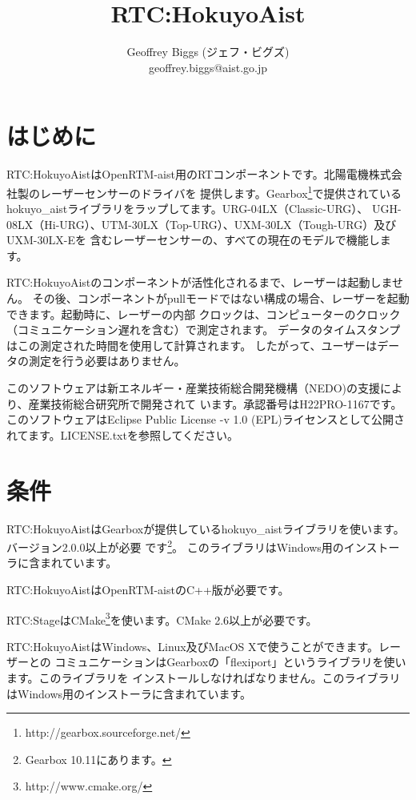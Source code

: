\documentclass[a4paper,10pt]{article}
\title{RTC:HokuyoAist}
\author{Geoffrey Biggs (ジェフ・ビグズ)\\
geoffrey.biggs@aist.go.jp}
\newenvironment{Japanese}{%
  \CJKfamily{min}%
  \CJKtilde
  \CJKnospace}{}
\begin{document}
\begin{CJK}{UTF8}{}
\begin{Japanese}

\maketitle

\section{はじめに}
\label{sec:intro}

RTC:HokuyoAistはOpenRTM-aist用のRTコンポーネントです。北陽電機株式会社製のレーザーセンサーのドライバを
提供します。Gearbox\footnote{http://gearbox.sourceforge.net/}で提供されているhokuyo\_aistライブラリをラップしてます。URG-04LX（Classic-URG）、
UGH-08LX（Hi-URG）、UTM-30LX（Top-URG）、UXM-30LX（Tough-URG）及びUXM-30LX-Eを
含むレーザーセンサーの、すべての現在のモデルで機能します。

RTC:HokuyoAistのコンポーネントが活性化されるまで、レーザーは起動しません。
その後、コンポーネントがpullモードではない構成の場合、レーザーを起動できます。起動時に、レーザーの内部
クロックは、コンピューターのクロック（コミュニケーション遅れを含む）で測定されます。
データのタイムスタンプはこの測定された時間を使用して計算されます。
したがって、ユーザーはデータの測定を行う必要はありません。

このソフトウェアは新エネルギー・産業技術総合開発機構（NEDO)の支援により、産業技術総合研究所で開発されて
います。承認番号はH22PRO-1167です。
このソフトウェアはEclipse Public License -v 1.0 (EPL)ライセンスとして公開されてます。LICENSE.txtを参照してください。

\section{条件}
\label{sec:requirements}

RTC:HokuyoAistはGearboxが提供しているhokuyo\_aistライブラリを使います。バージョン2.0.0以上が必要
です\footnote{Gearbox 10.11にあります。}。
このライブラリはWindows用のインストーラに含まれています。

RTC:HokuyoAistはOpenRTM-aistのC++版が必要です。

RTC:StageはCMake\footnote{http://www.cmake.org/}を使います。CMake
2.6以上が必要です。

RTC:HokuyoAistはWindows、Linux及びMacOS Xで使うことができます。レーザーとの
コミュニケーションはGearboxの「flexiport」というライブラリを使います。このライブラリを
インストールしなければなりません。このライブラリはWindows用のインストーラに含まれています。


\end{Japanese}
\end{CJK}
\end{document}
